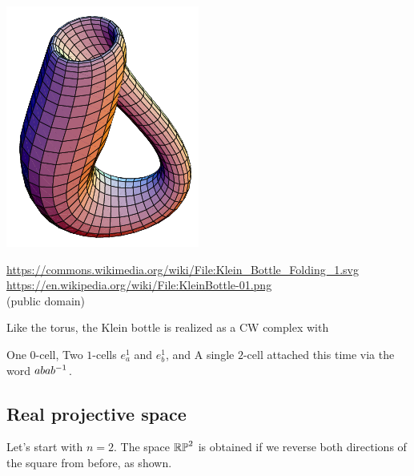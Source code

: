 \begin{center}
\begin{minipage}[c]{0.5\textwidth}
	\end{minipage}
	\quad
	\begin{minipage}[c]{0.3\textwidth}
	\includegraphics[width=\textwidth]{media/KleinBottle-01.png}
	\end{minipage}

	\tiny
	\url{https://commons.wikimedia.org/wiki/File:Klein_Bottle_Folding_1.svg} \\
	\url{https://en.wikipedia.org/wiki/File:KleinBottle-01.png} \\
	(public domain)
\end{center}


Like the torus, the Klein bottle is realized as a CW complex with
\begin{itemize}
	\ii One $0$-cell,
	\ii Two $1$-cells $e^1_a$ and $e^1_b$, and
	\ii A single $2$-cell attached this time via the word $abab^{-1}$.
\end{itemize}

\subsection*{Real projective space}
Let's start with $n=2$.
The space $\mathbb{RP}^2$ is obtained if we reverse both directions of
the square from before, as shown.

